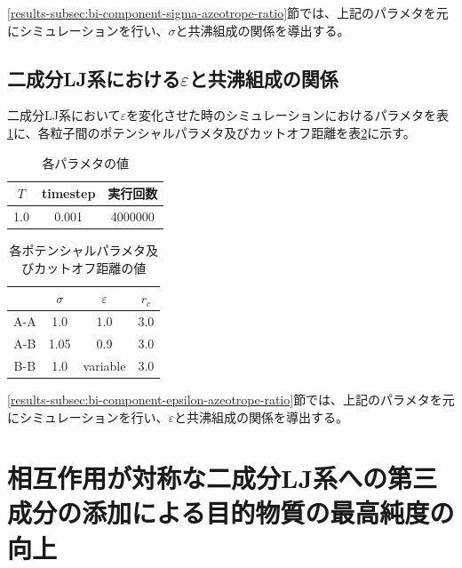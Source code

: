 \documentclass[titlepage]{jsreport}
\begin{document}
\ref{results-subsec:bi-component-sigma-azeotrope-ratio}節では、上記のパラメタを元にシミュレーションを行い、$\sigma$と共沸組成の関係を導出する。


\subsection{二成分LJ系における$\varepsilon$と共沸組成の関係} \label{method-subsec:bi-component-epsilon-azeotrope-ratio}
二成分LJ系において${\varepsilon}$を変化させた時のシミュレーションにおけるパラメタを表\ref{table:bi-component-epsilon-azeotrope-ratio-parameter}に、各粒子間のポテンシャルパラメタ及びカットオフ距離を表\ref{table:bi-component-epsilon-azeotrope-ratio-potential-parameter}に示す。

\begin{table}[htbp]
    \begin{center}
        \caption{各パラメタの値}
        \label{table:bi-component-epsilon-azeotrope-ratio-parameter}
        \begin{tabular}{c c c}
            $T$ & timestep & 実行回数 \\
            \hline
            1.0 & 0.001 & 4000000 \\
        \end{tabular}
    \end{center}
\end{table}

\begin{table}[htbp]
    \begin{center}
        \caption{各ポテンシャルパラメタ及びカットオフ距離の値}
        \label{table:bi-component-epsilon-azeotrope-ratio-potential-parameter}
        \begin{tabular}{c c c c}
            & $\sigma$ & $\varepsilon$ & $r_c$ \\
            \hline
            A-A & 1.0 & 1.0 & 3.0 \\
            A-B & 1.05 & 0.9 & 3.0 \\
            B-B & 1.0 & variable & 3.0
        \end{tabular}
    \end{center}
\end{table}

\ref{results-subsec:bi-component-epsilon-azeotrope-ratio}節では、上記のパラメタを元にシミュレーションを行い、$\varepsilon$と共沸組成の関係を導出する。


\section{相互作用が対称な二成分LJ系への第三成分の添加による目的物質の最高純度の向上} \label{method-sec:bi-component-addition-of-3rd-component-highest-purity}
\end{document}
